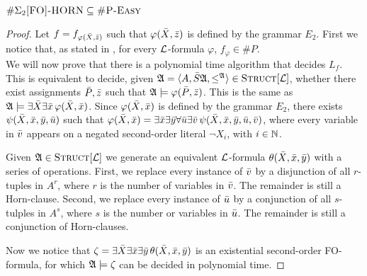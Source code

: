 \begin{theo}
	$\#\Sigma_2\textsc{[FO]-HORN} \subseteq \textsc{\#P-Easy}$
\end{theo} 
\begin{proof}
	Let $f = f_{\varphi(\bar{X},\bar{z})}$ such that $\varphi(\bar{X},\bar{z})$ is defined by the grammar $E_2$. First we notice that, as stated in \cite{DBLP:journals/jcss/SalujaST95}, for every ${\cal L}$-formula $\varphi$, $f_{\varphi}\in\#P$.\\
	
	We will now prove that there is a polynomial time algorithm that decides $L_{f}$. This is equivalent to decide, given ${\frak A}= \langle A, \bar{S}{\frak A}, \leq^{\frak A} \rangle\in\textsc{Struct}[{\cal L}]$, whether there exist assignments $\bar{P},\bar{z}$ such that ${\frak A}\models\varphi(\bar{P},\bar{z})$. This is the same as ${\frak A}\models\exists\bar{X}\exists\bar{x}\,\varphi(\bar{X},\bar{x})$. Since $\varphi(\bar{X},\bar{x})$ is defined by the grammar $E_2$, there exists $\psi(\bar{X},\bar{x},\bar{y},\bar{u})$ such that $\varphi(\bar{X},\bar{x}) = \exists\bar{x}\exists\bar{y}\forall\bar{u}\exists\bar{v}\,\psi(\bar{X},\bar{x},\bar{y},\bar{u},\bar{v})$, where every variable in $\bar{v}$ appears on a negated second-order literal $\neg X_i$, with $i\in\mathbb{N}$.
	
	Given ${\frak A}\in\textsc{Struct}[{\cal L}]$ we generate an equivalent ${\cal L}$-formula $\theta(\bar{X},\bar{x},\bar{y})$ with a series of operations. First, we replace every instance of $\bar{v}$ by a disjunction of all $r$-tuples in $A^r$, where $r$ is the number of variables in $\bar{v}$. The remainder is still a {\sc Horn}-clause. Second, we replace every instance of $\bar{u}$ by a conjunction of all $s$-tulples in $A^s$, where $s$ is the number or variables in $\bar{u}$. The remainder is still a conjunction of {\sc Horn}-clauses.
	
	Now we notice that $\zeta = \exists\bar{X}\exists\bar{x}\exists\bar{y}\,\theta(\bar{X},\bar{x},\bar{y})$ is an existential second-order FO-formula, for which ${\frak A}\models\zeta$ can be decided in polynomial time.
\end{proof}